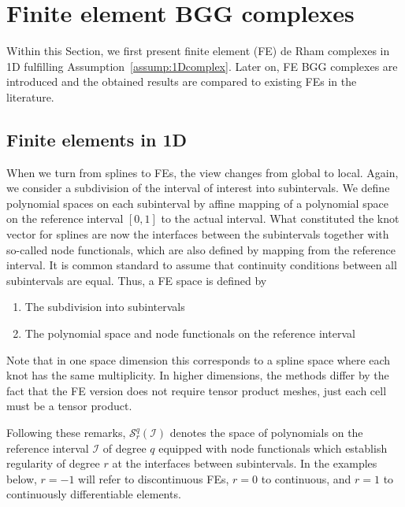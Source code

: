 \documentclass[final]{amsart}%
\newcommand{\0}{\mathaccent23}
\newcommand{\interval}{\mathcal I}
\begin{document}
\section{Finite element BGG complexes}
\label{sec:examples_fe}

Within this Section, we first present finite element (FE) de Rham complexes in 1D fulfilling Assumption~\ref{assump:1Dcomplex}. Later on, FE BGG complexes are introduced and the obtained results are compared to existing FEs in the literature.

\subsection{Finite elements in 1D}\label{sec:finite-elements}

When we turn from splines to FEs, the view changes from global to local. Again, we consider a subdivision of the interval of interest into subintervals.
We define polynomial spaces on each subinterval by affine mapping of a polynomial space on the reference interval $[0,1]$ to the actual interval.
What constituted the knot vector for splines are now the interfaces between the subintervals together with so-called node functionals, which are also defined by mapping from the reference interval. It is common standard to assume that continuity conditions between all subintervals are equal. Thus, a FE space is defined by
\begin{enumerate}
    \item The subdivision into subintervals
    \item The polynomial space and node functionals on the reference interval
\end{enumerate}
Note that in one space dimension this corresponds to a spline space where each knot has the same multiplicity. In higher dimensions, the methods differ by the fact that the FE version does not require tensor product meshes, just each cell must be a tensor product.

Following these remarks, $\mathcal{S}^q_{r}(\interval)$ denotes the space of polynomials on the reference interval $\interval$ of degree $q$ equipped with node functionals which establish regularity of degree $r$ at the interfaces between subintervals. In the examples below, $r=-1$ will refer to discontinuous FEs, $r=0$ to continuous, and $r=1$ to continuously differentiable elements.
\end{document}
